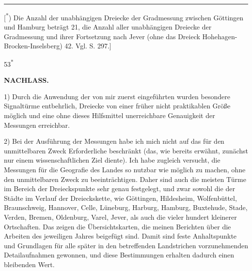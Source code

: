 \par\smallskip\noindent\rule{.24\linewidth}{.4pt}\par\smallskip
{\footnotesize\noindent\hspace*{\parindent}[\textsuperscript{*}) Die Anzahl der unabhängigen Dreiecke der Gradmessung zwischen Göttingen und Hamburg beträgt 21, die Anzahl aller unabhängigen Dreiecke der Gradmessung und ihrer Fortsetzung nach Jever (ohne das Dreieck Hohehagen-Brocken-Inselsberg) 42. Vgl. S. 297.]\par}

\par\smallskip\noindent\hfill{\footnotesize 53\textsuperscript{*}}\hspace*{.12\linewidth}\par

\par\clearpage
\noindent{}\hfill{\small\textbf{NACHLASS.}}\hfill\null\par\medskip

\par\noindent\hspace*{\parindent}1) Durch die Anwendung der von mir zuerst eingeführten  wurden besondere Signaltürme entbehrlich, Dreiecke von einer früher nicht praktikablen Größe möglich und eine ohne dieses Hilfsmittel unerreichbare Genauigkeit der Messungen erreichbar.

\par\noindent\hspace*{\parindent}2) Bei der Ausführung der Messungen habe ich mich nicht auf das für den unmittelbaren Zweck Erforderliche beschränkt (das, wie bereits erwähnt, zunächst nur einem wissenschaftlichen Ziel diente). Ich habe zugleich versucht, die Messungen für die Geografie des Landes so nutzbar wie möglich zu machen, ohne den unmittelbaren Zweck zu beeinträchtigen. Daher sind auch die meisten Türme im Bereich der Dreieckspunkte sehr genau festgelegt, und zwar sowohl die der Städte im Verlauf der Dreieckskette, wie Göttingen, Hildesheim, Wolfenbüttel, Braunschweig, Hannover, Celle, Lüneburg, Harburg, Hamburg, Buxtehude, Stade, Verden, Bremen, Oldenburg, Varel, Jever, als auch die vieler hundert kleinerer Ortschaften. Das zeigen die Übersichtskarten, die meinen Berichten über die Arbeiten des jeweiligen Jahres beigefügt sind. Damit sind feste Anhaltspunkte und Grundlagen für alle später in den betreffenden Landstrichen vorzunehmenden Detailaufnahmen gewonnen, und diese Bestimmungen erhalten dadurch einen bleibenden Wert.


